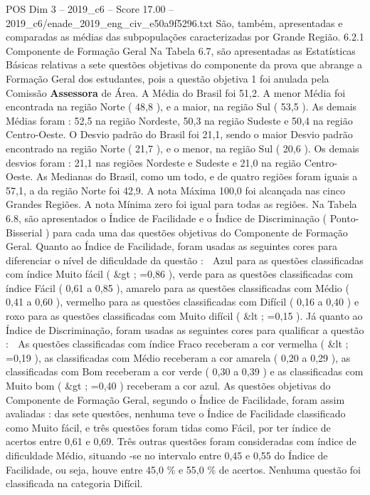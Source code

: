 \begin{textsample}{POS Dim 3 – 2019\_c6 – Score 17.00 – 2019\_c6/enade\_2019\_eng\_civ\_e50a9f5296.txt}
São, também, apresentadas e comparadas as médias das subpopulações caracterizadas por Grande Região. 6.2.1 Componente de Formação Geral Na Tabela 6.7, são apresentadas as Estatísticas Básicas relativas a sete questões objetivas do componente da prova que abrange a Formação Geral dos estudantes, pois a questão objetiva 1 foi anulada pela Comissão \textbf{Assessora} de Área.
A Média do Brasil foi 51,2.
A menor Média foi encontrada na região Norte ( 48,8 ), e a maior, na região Sul ( 53,5 ).
As demais Médias foram : 52,5 na região Nordeste, 50,3 na região Sudeste e 50,4 na região Centro-Oeste.
O Desvio padrão do Brasil foi 21,1, sendo o maior Desvio padrão encontrado na região Norte ( 21,7 ), e o menor, na região Sul ( 20,6 ).
Os demais desvios foram : 21,1 nas regiões Nordeste e Sudeste e 21,0 na região Centro-Oeste.
As Medianas do Brasil, como um todo, e de quatro regiões foram iguais a 57,1, a da região Norte foi 42,9.
A nota Máxima 100,0 foi alcançada nas cinco Grandes Regiões.
A nota Mínima zero foi igual para todas as regiões.
Na Tabela 6.8, são apresentados o Índice de Facilidade e o Índice de Discriminação ( Ponto-Bisserial ) para cada uma das questões objetivas do Componente de Formação Geral.
Quanto ao Índice de Facilidade, foram usadas as seguintes cores para diferenciar o nível de dificuldade da questão :  Azul para as questões classificadas com índice Muito fácil ( \&gt ; =0,86 ), verde para as questões classificadas com índice Fácil ( 0,61 a 0,85 ), amarelo para as questões classificadas com Médio ( 0,41 a 0,60 ), vermelho para as questões classificadas com Difícil ( 0,16 a 0,40 ) e roxo para as questões classificadas com Muito difícil ( \&lt ; =0,15 ).
Já quanto ao Índice de Discriminação, foram usadas as seguintes cores para qualificar a questão :  As questões classificadas com índice Fraco receberam a cor vermelha ( \&lt ; =0,19 ), as classificadas com Médio receberam a cor amarela ( 0,20 a 0,29 ), as classificadas com Bom receberam a cor verde ( 0,30 a 0,39 ) e as classificadas com Muito bom ( \&gt ; =0,40 ) receberam a cor azul.
As questões objetivas do Componente de Formação Geral, segundo o Índice de Facilidade, foram assim avaliadas : das sete questões, nenhuma teve o Índice de Facilidade classificado como Muito fácil, e três questões foram tidas como Fácil, por ter índice de acertos entre 0,61 e 0,69.
Três outras questões foram consideradas com índice de dificuldade Médio, situando -se no intervalo entre 0,45 e 0,55 do Índice de Facilidade, ou seja, houve entre 45,0 \% e 55,0 \% de acertos.
Nenhuma questão foi classificada na categoria Difícil.

\end{textsample}
